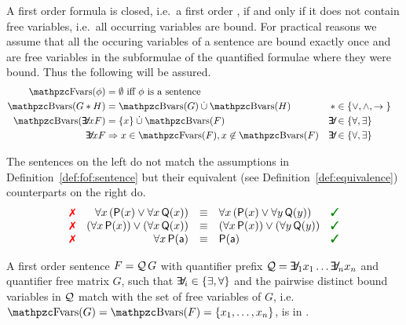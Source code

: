 \begin{definition}\label{def:fof:closed}\label{def:fof:sentence}
	A first order formula is closed, i.e.~a first order ,
	if and only if it does not contain free variables, 
	i.e.~all occurring variables are bound.
	For practical reasons we assume that all the occuring variables of a sentence
	are bound exactly once
	and are free variables
	in the subformulae of the quantified formulae where they were bound.
	Thus the following will be assured.
	\begin{align*}
		\fvar(\phi) &= \emptyset
		\text{ iff }\phi\text{ is a sentence}
		\\
		\bvar(G \connect H) &= \bvar(G)\disjointunion\bvar(H)
		&\connect& \in \SetOfConnectives
		\\
		\bvar(\quantify x F) &= \{x\}\disjointunion\bvar(F)
		&\quantify& \in \SetOfQuantifiers
		\\
		\quantify x F &\Rightarrow
		x\in\fvar(F), x\not\in\bvar(F)
		&\quantify& \in \SetOfQuantifiers
	\end{align*}
\end{definition}

\begin{example}The sentences on the left do not match
	the assumptions in Definition~\vref{def:fof:sentence}
	but their {equivalent (see Definition~\vref{def:equivalence})}
	counterparts on the right do.
	\[
	\begin{array}{rrcll}
		 \text{\color{colLo}{\xmark}}
		& \forall x\, ({\mP(x) \lor \forall x\, {\mQ(x)}})
		& {\equiv}
		& \forall x\, ({\mP(x) \lor \forall y\, {\mQ(y)}})
		& \text{\color{colHi}{\cmark}}
		\\ \text{\color{colLo}{\xmark}}
		& (\forall x\, {\mP(x)}) \lor (\forall x\, {\mQ(x)})
		& {\equiv}
		& (\forall x\, {\mP(x)}) \lor (\forall y\, {\mQ(y)})
		& \text{\color{colHi}{\cmark}}
		\\
		\text{\color{colLo}{\xmark}}
		&  \forall x\, {\mP(\ma)}
		& {\equiv}
		& \mP(\ma)
		& \text{\color{colHi}{\cmark}}
	\end{array}
	\]

\end{example}

\begin{definition}\label{def:prenex:normal:form}
	A first order sentence 
	\( F = \mathcal{Q}\,G \)
	with quantifier prefix 
	\( \mathcal{Q} = \quantify_1 x_1 \ldots \quantify_n x_n \)
	and quantifier free matrix \( G \),
	such that
	\( \quantify_i \in \{ \exists, \forall \} \) 
	and the pairwise distinct bound variables
	in \(\mathcal{Q}\)
	match with the set of free variables of \(G\), 
	i.e.~\( \fvar(G) = \bvar(F) = \{ x_1,\ldots,x_n \} \),
	is in .
\end{definition}

